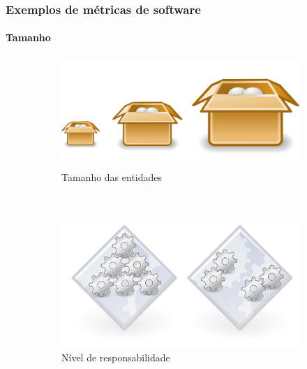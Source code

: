 \documentclass{beamer}
\begin{document}
\begin{frame}
  \frametitle{Exemplos de métricas de software}
  \framesubtitle{Tamanho}

  \begin{figure}
        \begin{subfigure}[b]{0.3\textwidth}
      \includegraphics[width=\textwidth]{images/size.png}
                \caption*{Tamanho das entidades}
                
        \end{subfigure}\qquad\qquad\qquad\qquad\qquad%
        ~ %
        \begin{subfigure}[b]{0.3\textwidth}
      \includegraphics[width=\textwidth]{images/cohesion.png}
                \caption*{Nível de responsabilidade}
        \end{subfigure}
        \begin{subfigure}[b]{0.3\textwidth}
      

\end{subfigure}
\end{figure}
\end{frame}
\end{document}
